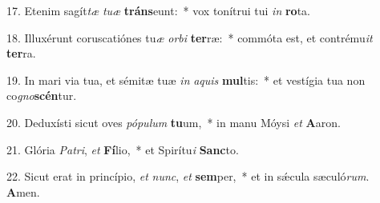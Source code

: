 17. Etenim sagít\textit{tæ} \textit{tu}\textit{æ} \textbf{tráns}eunt:~*  vox tonítrui tui \textit{in} \textbf{ro}ta.\

18. Illuxérunt coruscatiónes tu\textit{æ} \textit{or}\textit{bi} \textbf{ter}ræ:~*  commóta est, et contrému\textit{it} \textbf{ter}ra.\

19. In mari via tua, et sémitæ tuæ \textit{in} \textit{a}\textit{quis} \textbf{mul}tis:~*  et vestígia tua non co\textit{gno}\textbf{scén}tur.\

20. Deduxísti sicut oves \textit{pó}\textit{pu}\textit{lum} \textbf{tu}um,~*  in manu Móysi \textit{et} \textbf{A}aron.\

21. Glória \textit{Pa}\textit{tri}, \textit{et} \textbf{Fí}lio,~*  et Spirítu\textit{i} \textbf{Sanc}to.\

22. Sicut erat in princípio, \textit{et} \textit{nunc}, \textit{et} \textbf{sem}per,~*  et in sǽcula sæculó\textit{rum}. \textbf{A}men.\

